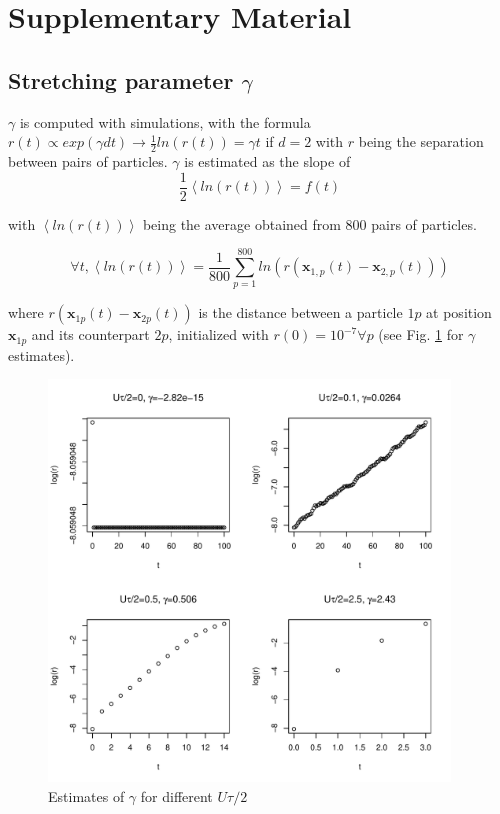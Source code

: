 \section*{Supplementary Material}
\subsection*{Stretching parameter $\gamma$}


$\gamma$ is computed with simulations, with the formula $r(t)\propto exp(\gamma dt)\rightarrow\frac{1}{2}ln(r(t))=\gamma t$
if $d=2$ with $r$ being the separation between pairs of particles. $\gamma$ is estimated as the slope of $$\frac{1}{2}\left\langle ln(r(t))\right\rangle =f(t)$$

with $\left\langle ln(r(t))\right\rangle $ being the average obtained from 800 pairs of particles. 

$$\forall t,\left\langle ln(r(t))\right\rangle =\frac{1}{800}\sum_{p=1}^{800}ln(r(\boldsymbol{x}_{1,p}(t)-\boldsymbol{x}_{2,p}(t)))$$ 

where $r(\boldsymbol{x}_{1p}(t)-\boldsymbol{x}_{2p}(t))$ is the distance between a particle $1p$ at position $\boldsymbol{x}_{1p}$ and its counterpart $2p$, initialized with $r(0)=10^{-7}\forall p$ (see
Fig. \ref{fig:gamma_Utot} for $\gamma$ estimates).

\begin{figure}[H]
\begin{centering}
\includegraphics[width=0.95\textwidth]{../code/figure/gamma_for_different_Utot.pdf}
\par\end{centering}
\caption{Estimates of $\gamma$ for different $U\tau/2$\label{fig:gamma_Utot}}
\end{figure}
